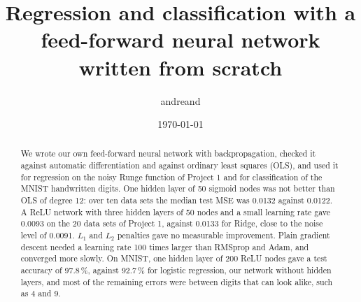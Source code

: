 \documentclass[english,notitlepage,reprint,nofootinbib,floatfix]{revtex4-2}
\begin{document}
\title{Regression and classification with a feed-forward neural network written from scratch}
\author{andreand}
\date{\today}

\begin{abstract}
We wrote our own feed-forward neural network with backpropagation, checked it against automatic differentiation and against ordinary least squares (OLS), and used it for regression on the noisy Runge function of Project 1 and for classification of the MNIST handwritten digits. One hidden layer of 50 sigmoid nodes was not better than OLS of degree 12: over ten data sets the median test MSE was 0.0132 against 0.0122. A ReLU network with three hidden layers of 50 nodes and a small learning rate gave 0.0093 on the 20 data sets of Project 1, against 0.0133 for Ridge, close to the noise level of 0.0091. $L_1$ and $L_2$ penalties gave no measurable improvement. Plain gradient descent needed a learning rate 100 times larger than RMSprop and Adam, and converged more slowly. On MNIST, one hidden layer of 200 ReLU nodes gave a test accuracy of 97.8\,\%, against 92.7\,\% for logistic regression, our network without hidden layers, and most of the remaining errors were between digits that can look alike, such as 4 and 9.
\end{abstract}

\maketitle










\end{document}
